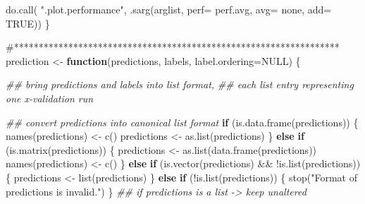\documentclass[
  letterpaper,
  DIV=11,
  numbers=noendperiod]{scrartcl}
\newenvironment{Shaded}{\begin{snugshade}}{\end{snugshade}}
\newcommand{\AttributeTok}[1]{\textcolor[rgb]{0.40,0.45,0.13}{#1}}
\newcommand{\CommentTok}[1]{\textcolor[rgb]{0.37,0.37,0.37}{#1}}
\newcommand{\ConstantTok}[1]{\textcolor[rgb]{0.56,0.35,0.01}{#1}}
\newcommand{\ControlFlowTok}[1]{\textcolor[rgb]{0.00,0.23,0.31}{\textbf{#1}}}
\newcommand{\DocumentationTok}[1]{\textcolor[rgb]{0.37,0.37,0.37}{\textit{#1}}}
\newcommand{\FunctionTok}[1]{\textcolor[rgb]{0.28,0.35,0.67}{#1}}
\newcommand{\NormalTok}[1]{\textcolor[rgb]{0.00,0.23,0.31}{#1}}
\newcommand{\OtherTok}[1]{\textcolor[rgb]{0.00,0.23,0.31}{#1}}
\newcommand{\SpecialCharTok}[1]{\textcolor[rgb]{0.37,0.37,0.37}{#1}}
\newcommand{\StringTok}[1]{\textcolor[rgb]{0.13,0.47,0.30}{#1}}
\begin{document}
\begin{Shaded}
\begin{Highlighting}[]
    \FunctionTok{do.call}\NormalTok{( }\StringTok{".plot.performance"}\NormalTok{, }\FunctionTok{.sarg}\NormalTok{(arglist,}
                                       \AttributeTok{perf=}\NormalTok{ perf.avg,}
                                       \AttributeTok{avg=} \StringTok{\textquotesingle{}none\textquotesingle{}}\NormalTok{,}
                                       \AttributeTok{add=} \ConstantTok{TRUE}\NormalTok{))}
\NormalTok{\}}

\CommentTok{\#******************************************************************}
\NormalTok{prediction }\OtherTok{\textless{}{-}} \ControlFlowTok{function}\NormalTok{(predictions, labels, }\AttributeTok{label.ordering=}\ConstantTok{NULL}\NormalTok{) \{}

    \DocumentationTok{\#\# bring \textquotesingle{}predictions\textquotesingle{} and \textquotesingle{}labels\textquotesingle{} into list format,}
    \DocumentationTok{\#\# each list entry representing one x{-}validation run}

    \DocumentationTok{\#\# convert predictions into canonical list format}
    \ControlFlowTok{if}\NormalTok{ (}\FunctionTok{is.data.frame}\NormalTok{(predictions)) \{}
        \FunctionTok{names}\NormalTok{(predictions) }\OtherTok{\textless{}{-}} \FunctionTok{c}\NormalTok{()}
\NormalTok{        predictions }\OtherTok{\textless{}{-}} \FunctionTok{as.list}\NormalTok{(predictions)}
\NormalTok{    \} }\ControlFlowTok{else} \ControlFlowTok{if}\NormalTok{ (}\FunctionTok{is.matrix}\NormalTok{(predictions)) \{}
\NormalTok{        predictions }\OtherTok{\textless{}{-}} \FunctionTok{as.list}\NormalTok{(}\FunctionTok{data.frame}\NormalTok{(predictions))}
        \FunctionTok{names}\NormalTok{(predictions) }\OtherTok{\textless{}{-}} \FunctionTok{c}\NormalTok{()}
\NormalTok{    \} }\ControlFlowTok{else} \ControlFlowTok{if}\NormalTok{ (}\FunctionTok{is.vector}\NormalTok{(predictions) }\SpecialCharTok{\&\&} \SpecialCharTok{!}\FunctionTok{is.list}\NormalTok{(predictions)) \{}
\NormalTok{        predictions }\OtherTok{\textless{}{-}} \FunctionTok{list}\NormalTok{(predictions)}
\NormalTok{    \} }\ControlFlowTok{else} \ControlFlowTok{if}\NormalTok{ (}\SpecialCharTok{!}\FunctionTok{is.list}\NormalTok{(predictions)) \{}
        \FunctionTok{stop}\NormalTok{(}\StringTok{"Format of predictions is invalid."}\NormalTok{)}
\NormalTok{    \} }
    \DocumentationTok{\#\# if predictions is a list {-}\textgreater{} keep unaltered}
  

\end{Highlighting}
\end{Shaded}
\end{document}
